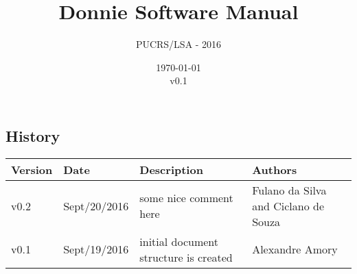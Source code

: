 \documentclass[11pt,a4paper,final]{report}
\author{PUCRS/LSA - 2016}
\title{Donnie Software Manual}
\date{\today\\v0.1}
\begin{document}
\pagestyle{empty}

\maketitle 

\tableofcontents






\begin{landscape}
\chapter{History}
\label{sec:history}

\thispagestyle{empty}

\begin{tabular}{p{1.5cm}p{3cm}p{12cm}p{6cm}}
	\toprule
	 \textbf{Version} & \textbf{Date} & \textbf{Description}  & \textbf{Authors}\\
	\midrule
v0.2 & Sept/20/2016 & some nice comment here & Fulano da Silva and Ciclano de Souza  \\
v0.1 & Sept/19/2016 & initial document structure is created & Alexandre Amory  \\
	\bottomrule
\end{tabular}

\end{landscape}
\end{document}

